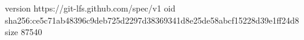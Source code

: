 version https://git-lfs.github.com/spec/v1
oid sha256:ce5c71ab48396c9deb725d2297d38369341d8e25de58abcf15228d39e1ff24d8
size 87540
